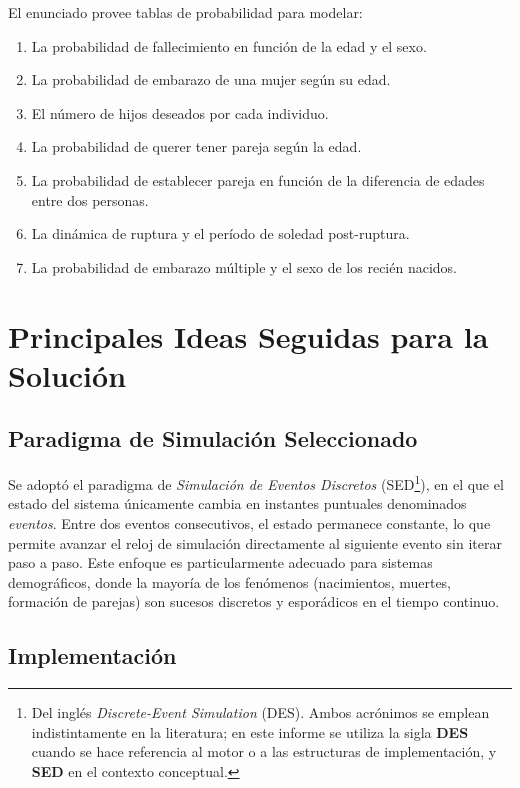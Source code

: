 \documentclass[12pt, a4paper]{article}
\begin{document}
El enunciado provee tablas de probabilidad para modelar:
\begin{enumerate}
  \item La probabilidad de fallecimiento en función de la edad y el sexo.
  \item La probabilidad de embarazo de una mujer según su edad.
  \item El número de hijos deseados por cada individuo.
  \item La probabilidad de querer tener pareja según la edad.
  \item La probabilidad de establecer pareja en función de la diferencia de
        edades entre dos personas.
  \item La dinámica de ruptura y el período de soledad post-ruptura.
  \item La probabilidad de embarazo múltiple y el sexo de los recién nacidos.
\end{enumerate}

\section{Principales Ideas Seguidas para la Solución}

\subsection{Paradigma de Simulación Seleccionado}

Se adoptó el paradigma de \textit{Simulación de Eventos Discretos}
(SED\footnote{Del inglés \textit{Discrete-Event Simulation} (DES). Ambos
acrónimos se emplean indistintamente en la literatura; en este informe se
utiliza la sigla \textbf{DES} cuando se hace referencia al motor o a las
estructuras de implementación, y \textbf{SED} en el contexto conceptual.}),
en el que el estado del sistema únicamente cambia en instantes puntuales
denominados \textit{eventos}. Entre dos eventos consecutivos, el estado
permanece constante, lo que permite avanzar el reloj de simulación
directamente al siguiente evento sin iterar paso a paso. Este enfoque es
particularmente adecuado para sistemas demográficos, donde la mayoría de
los fenómenos (nacimientos, muertes, formación de parejas) son sucesos
discretos y esporádicos en el tiempo continuo.

\subsection{Implementación}
\end{document}
